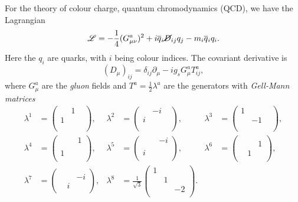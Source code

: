 For the theory of colour charge, quantum chromodynamics (QCD), we have the Lagrangian
\begin{equation}
  \mathscr{L} = -\frac{1}{4} (G^{a}_{\mu\nu})^2 + i \overline{q}{}_i \cancel{D}_{ij} q_j - m_i \overline{q}{}_i q_i.
\end{equation}
Here the $q_i$ are quarks, with $i$ being colour indices.
The covariant derivative is
\begin{equation}
  (D_{\mu})_{ij} = \delta_{ij} \partial_{\mu} - i g_s G_{\mu}^{a} T^{a}_{ij},
\end{equation}
where $G^{a}_{\mu}$ are the \emph{gluon} fields and $T^{a} = \frac{1}{2} \lambda^a$ are the generators with \emph{Gell-Mann matrices}
\begin{align}
  \lambda^1 &=
  \begin{pmatrix}
    & 1 &  \\
   1 &  &  \\
    &  &  \\
  \end{pmatrix},
    & \lambda^2 &= 
  \begin{pmatrix}
    & -i &  \\
   i &  &  \\
    &  &  \\
 \end{pmatrix}, &
  \lambda^3 &= 
  \begin{pmatrix}
   1 &  &  \\
    & -1 &  \\
    &  &  \\
  \end{pmatrix},  \\
  \lambda^4 &=
  \begin{pmatrix}
    &  & 1 \\
    &  &  \\
   1 &  &  \\
  \end{pmatrix},
	    & \lambda^5 &= 
  \begin{pmatrix}
    &  & -i \\
    &  &  \\
   i &  &  \\
 \end{pmatrix}, &
  \lambda^6 &= 
  \begin{pmatrix}
    &  &  \\
    &  & 1 \\
    & 1  &  \\
  \end{pmatrix},  \\
  \lambda^7 &=
  \begin{pmatrix}
    &  &  \\
    &  & -i \\
    & i &  \\
  \end{pmatrix},
  & \lambda^8 &= \frac{1}{\sqrt{3}}
  \begin{pmatrix}
   1 &  &  \\
    & 1 &  \\
    &  & -2 \\
 \end{pmatrix}.
\end{align}
